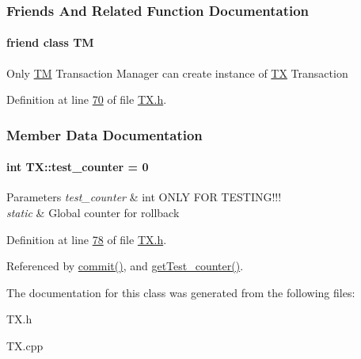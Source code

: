 \subsubsection{Friends And Related Function Documentation}
\paragraph[{\texorpdfstring{TM}{TM}}]{\setlength{\rightskip}{0pt plus 5cm}friend class {\bf TM}\hspace{0.3cm}{\ttfamily [friend]}}\hypertarget{class_t_x_adf1ccda799ef5c419cb43b8ae55eb45c}{}\label{class_t_x_adf1ccda799ef5c419cb43b8ae55eb45c}
Only \hyperlink{class_t_m}{TM} Transaction Manager can create instance of \hyperlink{class_t_x}{TX} Transaction 

Definition at line \hyperlink{_t_x_8h_source_l00070}{70} of file \hyperlink{_t_x_8h_source}{T\+X.\+h}.



\subsubsection{Member Data Documentation}
\paragraph[{\texorpdfstring{test\+\_\+counter}{test_counter}}]{\setlength{\rightskip}{0pt plus 5cm}int T\+X\+::test\+\_\+counter = 0\hspace{0.3cm}{\ttfamily [static]}}\hypertarget{class_t_x_a25838234aab99ae891a90eb8623a8b3c}{}\label{class_t_x_a25838234aab99ae891a90eb8623a8b3c}

\begin{DoxyParams}{Parameters}
{\em test\+\_\+counter} & int O\+N\+LY F\+OR T\+E\+S\+T\+I\+N\+G!!!\\
\hline
{\em static} & Global counter for rollback \\
\hline
\end{DoxyParams}


Definition at line \hyperlink{_t_x_8h_source_l00078}{78} of file \hyperlink{_t_x_8h_source}{T\+X.\+h}.



Referenced by \hyperlink{_t_x_8cpp_source_l00202}{commit()}, and \hyperlink{_t_x_8cpp_source_l00324}{get\+Test\+\_\+counter()}.



The documentation for this class was generated from the following files\+:\begin{DoxyCompactItemize}
\item 
T\+X.\+h\item 
T\+X.\+cpp\end{DoxyCompactItemize}
